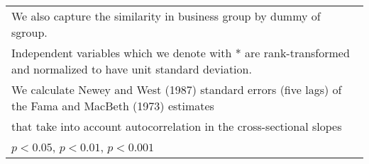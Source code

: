 {\begin{tabular}{l*{8}{c}}
\multicolumn{9}{l}{\footnotesize We also capture the similarity in business group by dummy of sgroup.}\\
\multicolumn{9}{l}{\footnotesize Independent variables which  we denote with * are rank-transformed and normalized to have unit standard deviation.}\\
\multicolumn{9}{l}{\footnotesize  We calculate Newey and West (1987) standard errors (five lags) of the Fama and MacBeth (1973) estimates }\\
\multicolumn{9}{l}{\footnotesize  that take into account autocorrelation in the cross-sectional slopes}\\
\multicolumn{9}{l}{\footnotesize \sym{*} \(p<0.05\), \sym{**} \(p<0.01\), \sym{***} \(p<0.001\)}\\
\end{tabular}
}
